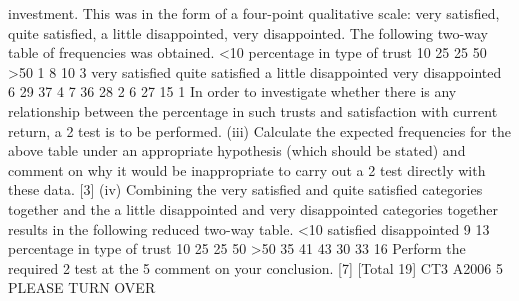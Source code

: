 \documentclass[a4paper,12pt]{article}
\begin{document}
\begin{enumerate}
investment. This was in the form of a four-point qualitative scale: very satisfied, quite
satisfied, a little disappointed, very disappointed. The following two-way table of
frequencies was obtained.
<10
percentage in type of trust
10 25
25 50
>50
1
8
10
3
very satisfied
quite satisfied
a little disappointed
very disappointed
6
29
37
4
7
36
28
2
6
27
15
1
In order to investigate whether there is any relationship between the percentage in
such trusts and satisfaction with current return, a 2 test is to be performed.
(iii) Calculate the expected frequencies for the above table under an appropriate
hypothesis (which should be stated) and comment on why it would be
inappropriate to carry out a 2 test directly with these data.
[3]
(iv) Combining the very satisfied and quite satisfied categories together and
the a little disappointed and very disappointed categories together results
in the following reduced two-way table.
<10
satisfied
disappointed
9
13
percentage in type of trust
10 25
25 50
>50
35
41
43
30
33
16
Perform the required 2 test at the 5%
comment on your conclusion.
[7]
[Total 19]
CT3 A2006 5
PLEASE TURN OVER




\end{enumerate}
\end{document}

